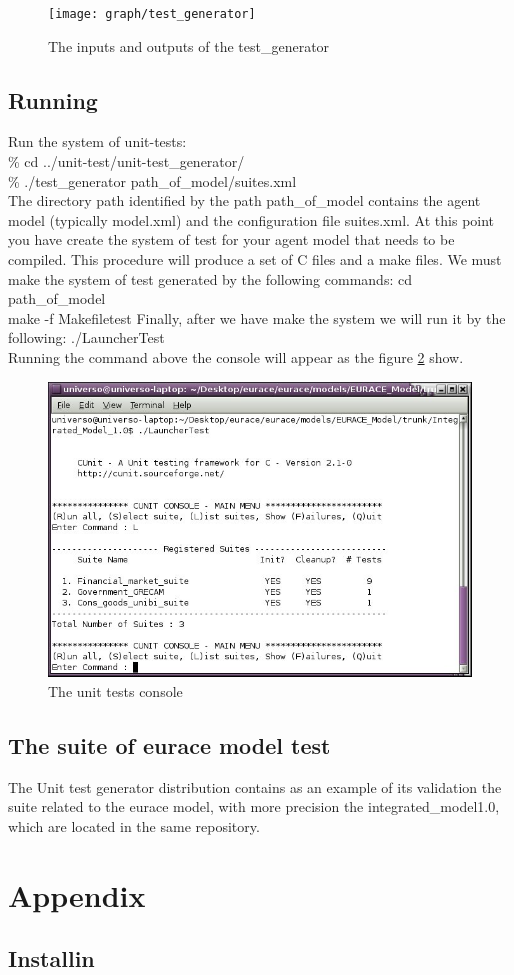 \documentclass[a4paper,10pt]{article}
\begin{document}
 \begin{figure}
 \label{fig:fig5}
\centering
\texttt{[image: graph/test\_generator]} 
\caption{The inputs and outputs of the test\_generator }
\end{figure}
\subsection{Running}
Run the system of unit-tests:\\
\% cd ../unit-test/unit-test\_generator/\\
\% ./test\_generator  path\_of\_model/suites.xml \\
The directory path identified by the path path\_of\_model contains the agent model (typically model.xml) and the configuration file suites.xml.
At this point you have create the system of test for your agent model that  needs to be compiled. This procedure will produce a set of C files and a make files.
We must make the system of test generated by the following commands: 
cd path\_of\_model\\
make -f Makefiletest
Finally, after we have make the system  we will run it by the following:
./LauncherTest \\
Running the command above the console will appear as the figure \ref{fig:fig6} show.
 \begin{figure}
 \label{fig:fig6}
\centering
\includegraphics[scale=0.7]{images/console} 
\caption{The unit tests console }
\end{figure}
\subsection{The suite of eurace model test }
The Unit test generator distribution contains as an  example of its validation  the suite related to the eurace model, with more precision the integrated\_model1.0, which are located in the same repository.
\section{Appendix}
\subsection{Installin}
\end{document}
